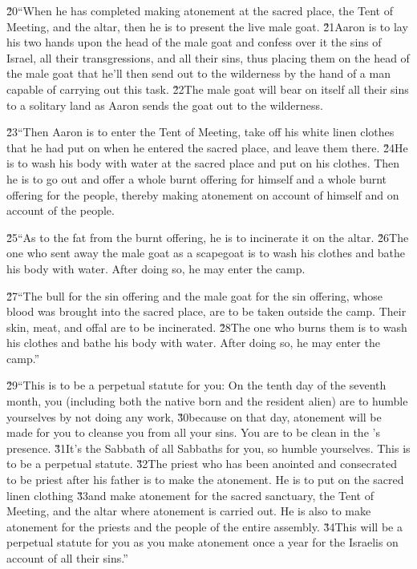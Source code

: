 \v{20}``When he has completed making atonement at the sacred place, the Tent of Meeting, and the altar, then he is to present the live male goat. \v{21}Aaron is to lay his two hands upon the head of the male goat and confess over it the sins of Israel, all their transgressions, and all their sins, thus placing them on the head of the male goat that he'll then send out to the wilderness by the hand of a man capable of carrying out this task. \v{22}The male goat will bear on itself all their sins to a solitary land as Aaron sends the goat out to the wilderness.

\v{23}``Then Aaron is to enter the Tent of Meeting, take off his white linen clothes that he had put on when he entered the sacred place, and leave them there. \v{24}He is to wash his body with water at the sacred place and put on his clothes. Then he is to go out and offer a whole burnt offering for himself and a whole burnt offering for the people, thereby making atonement on account of himself and on account of the people.

\v{25}``As to the fat from the burnt offering, he is to incinerate it on the altar. \v{26}The one who sent away the male goat as a scapegoat is to wash his clothes and bathe his body with water. After doing so, he may enter the camp.

\v{27}``The bull for the sin offering and the male goat for the sin offering, whose blood was brought into the sacred place, are to be taken outside the camp. Their skin, meat, and offal are to be incinerated. \v{28}The one who burns them is to wash his clothes and bathe his body with water. After doing so, he may enter the camp.''

\v{29}``This is to be a perpetual statute for you: On the tenth day of the seventh month, you (including both the native born and the resident alien) are to humble yourselves by not doing any work, \v{30}because on that day, atonement will be made for you to cleanse you from all your sins. You are to be clean in the 's presence. \v{31}It's the Sabbath of all Sabbaths for you, so humble yourselves. This is to be a perpetual statute. \v{32}The priest who has been anointed and consecrated to be priest after his father is to make the atonement. He is to put on the sacred linen clothing \v{33}and make atonement for the sacred sanctuary, the Tent of Meeting, and the altar where atonement is carried out. He is also to make atonement for the priests and the people of the entire assembly. \v{34}This will be a perpetual statute for you as you make atonement once a year for the Israelis on account of all their sins.''

